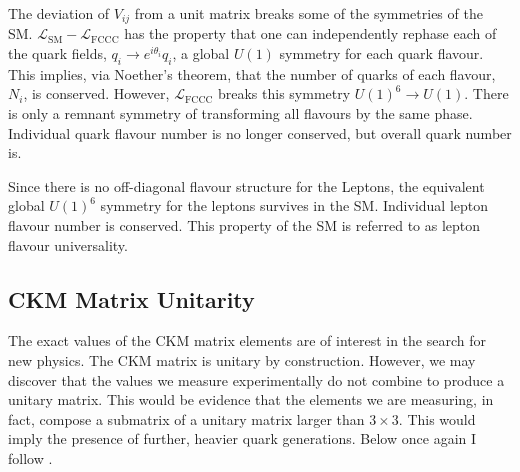 The deviation of $V_{ij}$ from a unit matrix breaks some of the symmetries of the SM. $\mathcal{L}_{\text{SM}}-\mathcal{L}_{\text{FCCC}}$ has the property that one can independently rephase each of the quark fields, $q_i\to e^{i\theta_i}q_i$, a global $U(1)$ symmetry for each quark flavour. This implies, via Noether's theorem, that the number of quarks of each flavour, $N_i$, is conserved. However, $\mathcal{L}_{\text{FCCC}}$ breaks this symmetry $U(1)^6\to U(1)$. There is only a remnant symmetry of transforming all flavours by the same phase. Individual quark flavour number is no longer conserved, but overall quark number is.

Since there is no off-diagonal flavour structure for the Leptons, the equivalent global $U(1)^6$ symmetry for the leptons survives in the SM. Individual lepton flavour number is conserved. This property of the SM is referred to as lepton flavour universality.

\subsection{CKM Matrix Unitarity}

The exact values of the CKM matrix elements are of interest in the search for new physics. The CKM matrix is unitary by construction. However, we may discover that the values we measure experimentally do not combine to produce a unitary matrix. This would be evidence that the elements we are measuring, in fact, compose a submatrix of a unitary matrix larger than $3\times 3$. This would imply the presence of further, heavier quark generations. Below once again I follow \cite{Schwartz:2013pla}.



